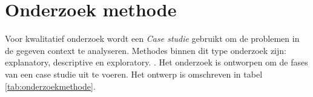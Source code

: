 \begin{comment}
\section{Literatuur} %

Voorbeelden van mogelijk jargon die zullen voorkomen in de thesis zijn data aggregaties, data transformaties en het selecteren en installeren van big data tools. Deze concepten worden onderlegd door onder andere de volgende literatuur:

\begin{itemize}
    \item Data Mining, Concepts and Techniques \parencite{data-mining}
    \item I <3 Logs, Event data, stream processing, and data integration \parencite{logs}
    \item Fast Data Processing with Spark \parencite{spark}
    \item Real-Time Big Data Analytics \parencite{realtime-architectures}
\end{itemize}

Tijdens de selectie wordt mogelijk gebruik gemaakt van verschillende fases uit “de Berenschot-methode” \parencite{cuppen}.
Daarnaast zal tijdens het voeren van gesprekken, interviews en presentaties binnen de organisatie mogelijk gebruik worden gemaakt van de theorie uit “Adviseren als tweede beroep, resultaat bereiken als adviseur” \parencite{adviseren}.
\end{comment}

\newpage
\section{Onderzoek methode} %
\label{sec:onderzoekmethode}


Voor kwalitatief onderzoek wordt een \textit{Case studie} gebruikt om de problemen in de gegeven context te analyseren. Methodes binnen dit type onderzoek zijn: explanatory, descriptive en exploratory. \parencite{john-dudovskiy}. Het onderzoek is ontworpen om de fases van een case studie uit te voeren. Het ontwerp is omschreven in tabel \ref{tab:onderzoekmethode}.


